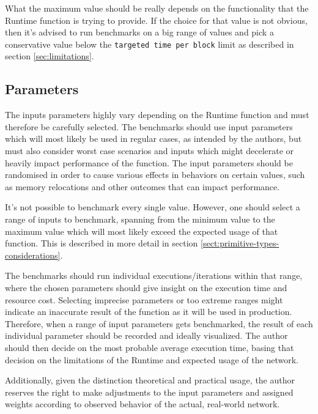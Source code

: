 \documentclass[11pt,a4paper]{article}
\begin{document}
\label{para:max-value} What the maximum value should be really depends on the
functionality that the Runtime function is trying to provide. If the choice for
that value is not obvious, then it's advised to run benchmarks on a big range of
values and pick a conservative value below the \verb|targeted time per block|
limit as described in section \ref{sec:limitations}.

\subsection{Parameters}
The inputs parameters highly vary depending on the Runtime function and must
therefore be carefully selected. The benchmarks should use input parameters
which will most likely be used in regular cases, as intended by the authors, but
must also consider worst case scenarios and inputs which might decelerate or
heavily impact performance of the function. The input parameters should be
randomised in order to cause various effects in behaviors on certain values,
such as memory relocations and other outcomes that can impact performance.
\newline

It's not possible to benchmark every single value. However, one should select a
range of inputs to benchmark, spanning from the minimum value to the maximum
value which will most likely exceed the expected usage of that function. This is
described in more detail in section \ref{sect:primitive-types-considerations}.
\newline

The benchmarks should run individual executions/iterations within that range,
where the chosen parameters should give insight on the execution time and
resource cost. Selecting imprecise parameters or too extreme ranges might
indicate an inaccurate result of the function as it will be used in production.
Therefore, when a range of input parameters gets benchmarked, the result of each
individual parameter should be recorded and ideally visualized. The author
should then decide on the most probable average execution time, basing that
decision on the limitations of the Runtime and expected usage of the network.
\newline

Additionally, given the distinction theoretical and practical usage, the author
reserves the right to make adjustments to the input parameters and assigned
weights according to observed behavior of the actual, real-world network.
\end{document}
